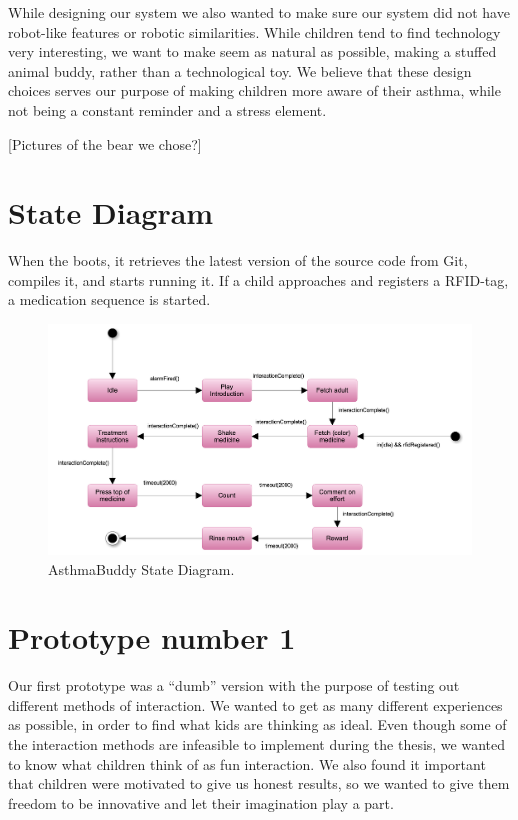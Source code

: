 While designing our system we also wanted to make sure our system did not have robot-like features or robotic similarities. While children tend to find technology very interesting, we want to make \buddy{} seem as natural as possible, making a stuffed animal buddy, rather than a technological toy. We believe that these design choices serves our purpose of making children more aware of their asthma, while not being a constant reminder and a stress element.

[Pictures of the bear we chose?]


\section{State Diagram}
When the \rpi{} boots, it retrieves the latest version of the source code from Git, compiles it, and starts running it. If a child approaches \buddy{} and registers a RFID-tag, a medication sequence is started.  

\begin{figure}[H] 
	\centering
		\includegraphics[width=0.6\paperwidth]{Pictures/statediagram.png}
	\caption{AsthmaBuddy State Diagram.}
	\label{fig:asthmabuddy_statediagram}
\end{figure}
 
\section{Prototype number 1}
Our first prototype was a ``dumb'' version with the purpose of testing out different methods of interaction. We wanted to get as many different experiences as possible, in order to find what kids are thinking as ideal. Even though some of the interaction methods are infeasible to implement during the thesis, we wanted to know what children think of as fun interaction. We also found it important that children were motivated to give us honest results, so we wanted to give them freedom to be innovative and let their imagination play a part.  

